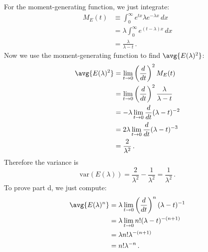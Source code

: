 For the moment-generating function, we just integrate:
\begin{align*}
  M_E(t)
  &\equiv \int_0^\infty e^{t x} \lambda e^{-\lambda x} \, dx \\
  &= \lambda \int_0^\infty e^{(t-\lambda) x} \, dx \\
  &= \frac{\lambda}{\lambda - t} \, .
\end{align*}
Now we use the moment-generating function to find $\avg{E(\lambda)^2}$:
\begin{align*}
  \avg{E(\lambda)^2}
  &= \lim_{t \to 0} \left( \frac{d}{dt} \right)^2 M_E(t) \\
  &= \lim_{t \to 0} \left( \frac{d}{dt} \right)^2 \frac{\lambda}{\lambda - t} \\
  &= -\lambda \lim_{t \to 0} \frac{d}{dt} (\lambda - t)^{-2} \\
  &= 2 \lambda \lim_{t \to 0} \frac{d}{dt} (\lambda - t)^{-3} \\
  &= \frac{2}{\lambda^2} \, .
\end{align*}
Therefore the variance is
\begin{equation*}
  \text{var}(E(\lambda)) = \frac{2}{\lambda^2} - \frac{1}{\lambda^2} = \frac{1}{\lambda^2} \, .
\end{equation*}
To prove part d, we just compute:
\begin{align*}
  \avg{E(\lambda)^n}
  &= \lambda \lim_{t \to 0} \left( \frac{d}{dt} \right)^n (\lambda - t)^{-1} \\
  &= \lambda \lim_{t \to 0} n! (\lambda - t)^{-(n+1)} \\
  &= \lambda n! \lambda^{-(n+1)} \\
  &= n! \lambda^{-n} \, .
\end{align*}
